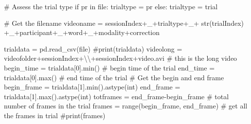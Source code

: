 \documentclass[
  letterpaper,
  DIV=11,
  numbers=noendperiod]{scrreprt}
\newenvironment{Shaded}{\begin{snugshade}}{\end{snugshade}}
\newcommand{\BuiltInTok}[1]{\textcolor[rgb]{0.00,0.23,0.31}{#1}}
\newcommand{\CharTok}[1]{\textcolor[rgb]{0.13,0.47,0.30}{#1}}
\newcommand{\CommentTok}[1]{\textcolor[rgb]{0.37,0.37,0.37}{#1}}
\newcommand{\ControlFlowTok}[1]{\textcolor[rgb]{0.00,0.23,0.31}{#1}}
\newcommand{\KeywordTok}[1]{\textcolor[rgb]{0.00,0.23,0.31}{#1}}
\newcommand{\NormalTok}[1]{\textcolor[rgb]{0.00,0.23,0.31}{#1}}
\newcommand{\OperatorTok}[1]{\textcolor[rgb]{0.37,0.37,0.37}{#1}}
\newcommand{\StringTok}[1]{\textcolor[rgb]{0.13,0.47,0.30}{#1}}
\begin{document}
\begin{Shaded}
\begin{Highlighting}[]
            \CommentTok{\# Assess the trial type}
            \ControlFlowTok{if} \StringTok{\textquotesingle{}pr\textquotesingle{}} \KeywordTok{in} \BuiltInTok{file}\NormalTok{:}
\NormalTok{                trialtype }\OperatorTok{=} \StringTok{\textquotesingle{}pr\textquotesingle{}}
            \ControlFlowTok{else}\NormalTok{:}
\NormalTok{                trialtype }\OperatorTok{=} \StringTok{\textquotesingle{}trial\textquotesingle{}}

            \CommentTok{\# Get the filename}
\NormalTok{            videoname }\OperatorTok{=}\NormalTok{ sessionIndex}\OperatorTok{+}\StringTok{\textquotesingle{}\_\textquotesingle{}}\OperatorTok{+}\NormalTok{trialtype}\OperatorTok{+}\StringTok{\textquotesingle{}\_\textquotesingle{}}\OperatorTok{+} \BuiltInTok{str}\NormalTok{(trialIndex) }\OperatorTok{+}\StringTok{\textquotesingle{}\_\textquotesingle{}}\OperatorTok{+}\NormalTok{participant}\OperatorTok{+}\StringTok{\textquotesingle{}\_\textquotesingle{}}\OperatorTok{+}\NormalTok{word}\OperatorTok{+}\StringTok{\textquotesingle{}\_\textquotesingle{}}\OperatorTok{+}\NormalTok{modality}\OperatorTok{+}\NormalTok{correction}

\NormalTok{        trialdata }\OperatorTok{=}\NormalTok{ pd.read\_csv(}\BuiltInTok{file}\NormalTok{)}
        \CommentTok{\#print(trialdata)}
\NormalTok{        videolong }\OperatorTok{=}\NormalTok{ videofolder}\OperatorTok{+}\NormalTok{sessionIndex}\OperatorTok{+}\StringTok{\textquotesingle{}}\CharTok{\textbackslash{}\textbackslash{}}\StringTok{\textquotesingle{}}\OperatorTok{+}\NormalTok{sessionIndex}\OperatorTok{+}\StringTok{\textquotesingle{}{-}video.avi\textquotesingle{}} \CommentTok{\# this is the long video }
\NormalTok{        begin\_time }\OperatorTok{=}\NormalTok{ trialdata[}\StringTok{\textquotesingle{}0\textquotesingle{}}\NormalTok{].}\BuiltInTok{min}\NormalTok{() }\CommentTok{\# begin time of the trial}
\NormalTok{        end\_time }\OperatorTok{=}\NormalTok{ trialdata[}\StringTok{\textquotesingle{}0\textquotesingle{}}\NormalTok{].}\BuiltInTok{max}\NormalTok{() }\CommentTok{\# end time of the trial}
        \CommentTok{\# Get the begin and end frame}
\NormalTok{        begin\_frame }\OperatorTok{=}\NormalTok{ trialdata[}\StringTok{\textquotesingle{}1\textquotesingle{}}\NormalTok{].}\BuiltInTok{min}\NormalTok{().astype(}\BuiltInTok{int}\NormalTok{)}
\NormalTok{        end\_frame }\OperatorTok{=}\NormalTok{ trialdata[}\StringTok{\textquotesingle{}1\textquotesingle{}}\NormalTok{].}\BuiltInTok{max}\NormalTok{().astype(}\BuiltInTok{int}\NormalTok{)}
\NormalTok{        totframes }\OperatorTok{=}\NormalTok{ end\_frame}\OperatorTok{{-}}\NormalTok{begin\_frame }\CommentTok{\# total number of frames in the trial}
\NormalTok{        frames }\OperatorTok{=} \BuiltInTok{range}\NormalTok{(begin\_frame, end\_frame) }\CommentTok{\# get all the frames in trial}
        \CommentTok{\#print(frames)}
        

\end{Highlighting}
\end{Shaded}
\end{document}
